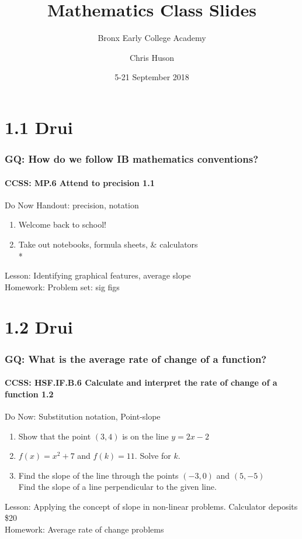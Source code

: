 \documentclass{beamer}
\title{Mathematics Class Slides}
\subtitle{Bronx Early College Academy}
\author{Chris Huson}
\date{5-21 September 2018}
\begin{document}
\frame{\titlepage}


  \section{1.1 Drui}
  \frame
  {
    \frametitle{GQ: How do we follow IB mathematics conventions?}
    \framesubtitle{CCSS: MP.6 Attend to precision   \alert{1.1}}

    \begin{block}{Do Now Handout: precision, notation}
    \begin{enumerate}
        \item Welcome back to school!
        \item Take out notebooks, formula sheets, \& calculators\\*
    \end{enumerate}
    \end{block}
    Lesson: Identifying graphical features, average slope \\%
    Homework: Problem set: sig figs
  }

\section{1.2 Drui}
  \frame
  {
    \frametitle{GQ: What is the average rate of change of a function?}
    \framesubtitle{CCSS: HSF.IF.B.6 Calculate and interpret the rate of change of a function   \alert{1.2}}

    \begin{block}{Do Now: Substitution notation, Point-slope}
    \begin{enumerate}
        \item Show that the point $(3, 4)$ is on the line $y=2x-2$
        \item $f(x)=x^2+7$ and $f(k)=11$. Solve for $k$.
        \item Find the slope of the line through the points $(-3,0)$ and $(5, -5)$ \\
        Find the slope of a line perpendicular to the given line.
    \end{enumerate}
    \end{block}
    Lesson: Applying the concept of slope in non-linear problems.
    Calculator deposits \$20
    \\%
    Homework: Average rate of change problems
  }
\end{document}
